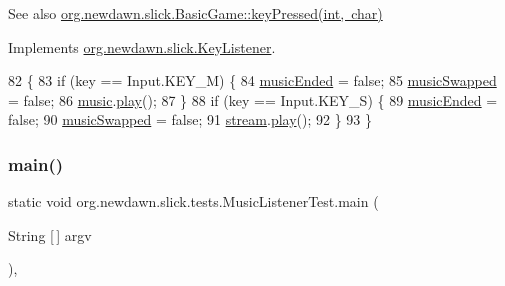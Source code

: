 \begin{DoxySeeAlso}{See also}
\mbox{\hyperlink{classorg_1_1newdawn_1_1slick_1_1_basic_game_a4fbb3345b5abf5ddd54a99466d07f02f}{org.\+newdawn.\+slick.\+Basic\+Game\+::key\+Pressed(int, char)}} 
\end{DoxySeeAlso}


Implements \mbox{\hyperlink{interfaceorg_1_1newdawn_1_1slick_1_1_key_listener_ac0b0568a21ef486c4f51382614c196ef}{org.\+newdawn.\+slick.\+Key\+Listener}}.


\begin{DoxyCode}
82                                             \{
83         \textcolor{keywordflow}{if} (key == Input.KEY\_M) \{
84             \mbox{\hyperlink{classorg_1_1newdawn_1_1slick_1_1tests_1_1_music_listener_test_ad701c702ddf8e4f55e1d6e2b9e8b25c7}{musicEnded}} = \textcolor{keyword}{false};
85             \mbox{\hyperlink{classorg_1_1newdawn_1_1slick_1_1tests_1_1_music_listener_test_a00672f601ac67a12c1fb5218a89b1a6c}{musicSwapped}} = \textcolor{keyword}{false};
86             \mbox{\hyperlink{classorg_1_1newdawn_1_1slick_1_1tests_1_1_music_listener_test_a3548ac70c36c26e6f4215ab5f4ef9821}{music}}.\mbox{\hyperlink{classorg_1_1newdawn_1_1slick_1_1_music_a605a881eef7e5a4cca79cdeec7234fd0}{play}}();
87         \}
88         \textcolor{keywordflow}{if} (key == Input.KEY\_S) \{
89             \mbox{\hyperlink{classorg_1_1newdawn_1_1slick_1_1tests_1_1_music_listener_test_ad701c702ddf8e4f55e1d6e2b9e8b25c7}{musicEnded}} = \textcolor{keyword}{false};
90             \mbox{\hyperlink{classorg_1_1newdawn_1_1slick_1_1tests_1_1_music_listener_test_a00672f601ac67a12c1fb5218a89b1a6c}{musicSwapped}} = \textcolor{keyword}{false};
91             \mbox{\hyperlink{classorg_1_1newdawn_1_1slick_1_1tests_1_1_music_listener_test_a9e428dbc6b297edff18908dec9c9a305}{stream}}.\mbox{\hyperlink{classorg_1_1newdawn_1_1slick_1_1_music_a605a881eef7e5a4cca79cdeec7234fd0}{play}}();
92         \}
93     \}
\end{DoxyCode}
\mbox{\label{classorg_1_1newdawn_1_1slick_1_1tests_1_1_music_listener_test_a7f87a637f4a5b3c49cc898297c5e3a04}} 
\subsubsection{\texorpdfstring{main()}{main()}}
{\footnotesize\ttfamily static void org.\+newdawn.\+slick.\+tests.\+Music\+Listener\+Test.\+main (\begin{DoxyParamCaption}\item[{String \mbox{[}$\,$\mbox{]}}]{argv }\end{DoxyParamCaption})\hspace{0.3cm}{\ttfamily [inline]}, {\ttfamily [static]}}

